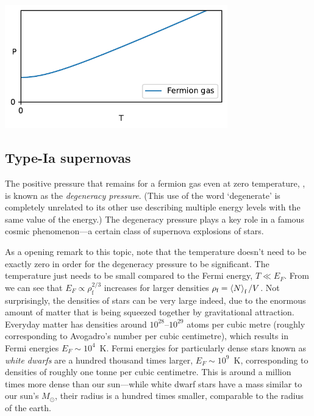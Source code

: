 \begin{center}\includegraphics[width=0.725\textwidth]{figs/unit08_pressure.pdf}\end{center}



\subsection{Type-Ia supernovas}
The positive pressure that remains for a fermion gas even at zero temperature, , is known as the \textit{degeneracy pressure}.
(This use of the word `degenerate' is completely unrelated to its other use describing multiple energy levels with the same value of the energy.)
The degeneracy pressure plays a key role in a famous cosmic phenomenon---a certain class of supernova explosions of stars.

As a opening remark to this topic, note that the temperature doesn't need to be exactly zero in order for the degeneracy pressure to be significant.
The temperature just needs to be small compared to the Fermi energy, $T \ll E_F$.
From  we can see that $E_F \propto \rho_{\text{f}}^{2 / 3}$ increases for larger densities $\rho_{\text{f}} = \left\langle N \right\rangle_{\text{f}} / V$.
Not surprisingly, the densities of stars can be very large indeed, due to the enormous amount of matter that is being squeezed together by gravitational attraction.
Everyday matter has densities around $10^{28}$--$10^{29}$ atoms per cubic metre (roughly corresponding to Avogadro's number per cubic centimetre), which results in Fermi energies $E_F \sim 10^4$~K. %
Fermi energies for particularly dense stars known as \textit{white dwarfs} are a hundred thousand times larger, $E_F \sim 10^9$~K, corresponding to densities of roughly one tonne per cubic centimetre.
This is around a million times more dense than our sun---while white dwarf stars have a mass similar to our sun's $M_{\odot}$, their radius is a hundred times smaller, comparable to the radius of the earth.

